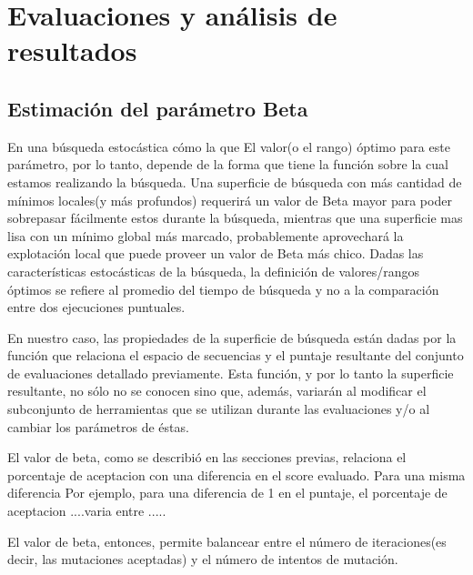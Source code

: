 \chapter{Evaluaciones y análisis de resultados}
\label{results}

\section{Estimación del parámetro Beta}
En una búsqueda estocástica cómo la que 
El valor(o el rango) óptimo para este parámetro, por lo tanto, depende de la forma que tiene la función sobre la cual estamos realizando la búsqueda.
Una superficie de búsqueda con más cantidad de mínimos locales(y más profundos) requerirá un valor de Beta mayor para poder sobrepasar fácilmente estos durante la búsqueda, 
mientras que una superficie mas lisa con un mínimo global más marcado, probablemente aprovechará la explotación local que puede proveer un valor de Beta más chico. 
Dadas las características estocásticas de la búsqueda, la definición de valores/rangos óptimos se refiere al promedio del tiempo de búsqueda y no a la comparación entre dos ejecuciones puntuales.

En nuestro caso, las propiedades de la superficie de búsqueda están dadas por la función que relaciona el espacio de secuencias y el puntaje resultante del conjunto de evaluaciones detallado previamente.
Esta función, y por lo tanto la superficie resultante, no sólo no se conocen sino que, además, variarán al modificar el subconjunto de herramientas que se utilizan durante las evaluaciones y/o al cambiar los parámetros de éstas.

El valor de beta, como se describió en las secciones previas, relaciona el porcentaje de aceptacion con una diferencia en el score evaluado.
Para una misma diferencia
Por ejemplo, para una diferencia de 1 en el puntaje, el porcentaje de aceptacion ....varia entre .....

El valor de beta, entonces, permite balancear entre el número de iteraciones(es decir, las mutaciones aceptadas) y el número de intentos de mutación.  

